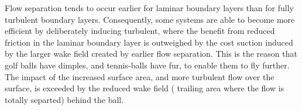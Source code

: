 \documentclass{article}\usepackage[]{graphicx}\usepackage[]{color}
\begin{document}
\begin{appendices}
Flow separation tends to occur earlier for laminar boundary layers than for fully turbulent boundary layers.  Consequently, some systems are able to become more efficient  by deliberately inducing turbulent, where the benefit from reduced friction in the laminar boundary layer is outweighed by the cost suction induced by the larger wake field created by earlier flow separation.  This is the reason that golf balls have dimples, and tennis-balls have fur, to enable them to fly further.  The impact of the increased surface area, and more turbulent flow over the surface, is exceeded by the reduced wake field ( trailing area where the flow is totally separted) behind the ball.
\end{appendices}
\end{document}
